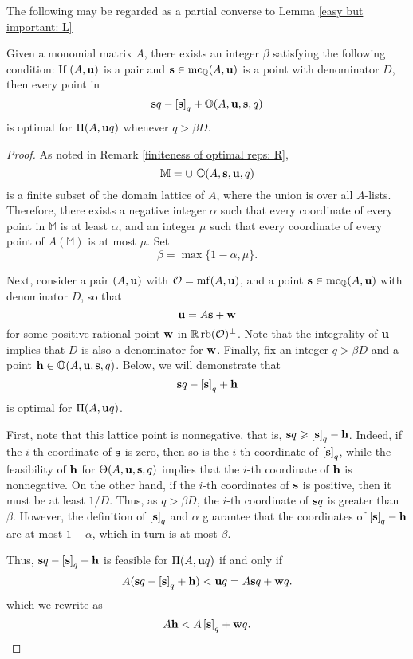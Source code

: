 \documentclass[11pt]{amsart}
\renewcommand{\!}[1]{{\color{red}\text{$\star$\,}#1\,$\star$}}
\begin{document}
The following may be regarded as a partial converse to Lemma \ref{easy but important: L}

\begin{proposition}
\label{uniform value: P}
Given a monomial matrix $A$, there exists an integer $\beta$ satisfying the following condition:  If $(A, \mathbf{u})$ is a pair and $\mathbf{s} \in \operatorname{mc}_{\mathbb{Q}}(A, \mathbf{u})$ is a point with denominator $D$, then every point in
\[ \mathbf{s}q - \left[ \mathbf{s} \right]_q + \mathbb{O}(A, \mathbf{u}, \mathbf{s}, q) \] is optimal for $\Pi(A, \mathbf{u}q)$ whenever $q >  \beta D$. 
\end{proposition}

\begin{proof} As noted in Remark \ref{finiteness of optimal reps: R}, 
%
\[ \mathbb{M} = \cup  \ \mathbb{O}( A, \mathbf{s}, \mathbf{u}, q )\]
%
is a finite subset of the domain lattice of $A$, where the union is over all $A$-lists.  Therefore, there exists a negative integer $\alpha$ such that every coordinate of every point in $\mathbb{M}$ is at least $\alpha$, and an integer $\mu$ such that every coordinate of every point of $A (\mathbb{M})$ is at most $\mu$.  Set \[ \beta =  \max \{ 1-\alpha, \mu \}.\]

Next, consider a pair $(A, \mathbf{u})$ with $\mathcal{O} = \operatorname{mf}(A, \mathbf{u})$, and a point $\mathbf{s} \in \operatorname{mc}_{\mathbb{Q}}(A, \mathbf{u})$ with denominator $D$, so that  \[ \mathbf{u} = A \mathbf{s} + \mathbf{w} \] for some positive rational point $\mathbf{w}$ in $\mathbb{R} \operatorname{rb}(\mathcal{O})^{\perp}$.  Note that the integrality of $\mathbf{u}$ implies that $D$ is also a denominator for $\mathbf{w}$.  Finally, fix an integer $q > \beta D$ and a point $\mathbf{h} \in \mathbb{O}(A, \mathbf{u}, \mathbf{s}, q)$.  Below, we will demonstrate that \[ \mathbf{s}q - \left[ \mathbf{s} \right]_q + \mathbf{h}\] is optimal for $\Pi(A, \mathbf{u}q)$.  

First, note that this lattice point is nonnegative, that is,   $\mathbf{s}q \geqslant \left[ \mathbf{s} \right]_q - \mathbf{h}$.  Indeed, if the $i$-th coordinate of $\mathbf{s}$ is zero, then so is the $i$-th coordinate of $\left[ \mathbf{s} \right]_q$, while the feasibility of  $\mathbf{h}$ for $\Theta(A, \mathbf{u}, \mathbf{s}, q)$ implies that the $i$-th coordinate of $\mathbf{h}$ is nonnegative.  On the other hand, if the $i$-th coordinates of $\mathbf{s}$ is positive, then it must be at least $1/D$.  Thus, as $q > \beta D$, the $i$-th coordinate of $\mathbf{s}q$ is greater than $\beta$.  However, the definition of $\left[ \mathbf{s} \right]_q$ and $\alpha$ guarantee that the coordinates of $\left[ \mathbf{s} \right]_q - \mathbf{h}$ are at most $1-\alpha$, which in turn is at most $\beta$.

Thus, $\mathbf{s}q - \left[ \mathbf{s} \right]_q + \mathbf{h}$ is feasible for $\Pi(A, \mathbf{u}q)$ if and only if
\[ A (\mathbf{s}q - \left[ \mathbf{s} \right]_q + \mathbf{h})  < \mathbf{u}q = A {\mathbf{s}}q + \mathbf{w}q.\] 
which we rewrite as 
\begin{equation} 
\label{equivalent ineq: e}
A \mathbf{h} < A \left[ \mathbf{s} \right]_q + \mathbf{w}q.
\end{equation}


\end{proof}
\end{document}

